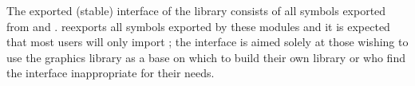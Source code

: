The exported (stable) interface of the library consists of all symbols
exported from  and .
 reexports all symbols exported by these modules
and it is expected that most users will only import ;
the  interface is
aimed solely at those wishing to use the graphics library as a base on
which to build their own library or who find the
 interface inappropriate for their needs.


\iffalse
%

\else

\fi




